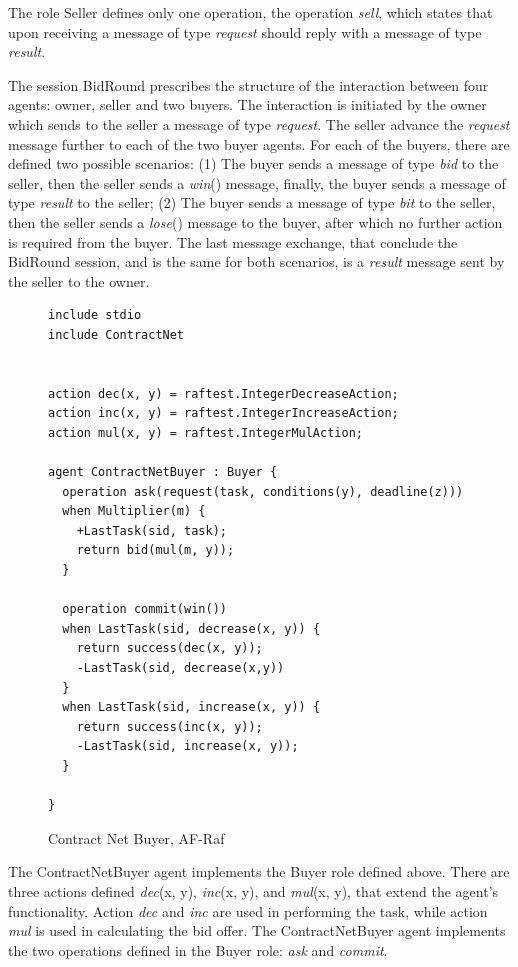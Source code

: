 \documentclass[a4paper,12pt,oneside,fleqn]{book} %
\begin{document}
The role Seller defines only one operation, the operation \textit{sell},
which states that upon receiving a message of type \textit{request} should reply
with a message of type \textit{result}.

The session BidRound prescribes the structure of the interaction between
four agents: owner, seller and two buyers. The interaction is initiated by
the owner which sends to the seller a message of type \textit{request}. The
seller advance the \textit{request} message further to each of the two
buyer agents. For each of the buyers, there are defined two possible
scenarios: (1) The buyer sends a message of type \textit{bid} to the
seller, then the seller sends a \textit{win}() message, finally, the buyer
sends a message of type \textit{result} to the seller; (2) The buyer sends
a message of type \textit{bit} to the seller, then the seller sends a
\textit{lose}() message to the buyer, after which no further action is
required from the buyer. The last message exchange, that conclude the
BidRound session, and is the same for both scenarios, is a \textit{result}
message sent by the seller to the owner.

\begin{figure}\footnotesize %
\begin{verbatim}
include stdio
include ContractNet


action dec(x, y) = raftest.IntegerDecreaseAction;
action inc(x, y) = raftest.IntegerIncreaseAction;
action mul(x, y) = raftest.IntegerMulAction;

agent ContractNetBuyer : Buyer {
  operation ask(request(task, conditions(y), deadline(z)))
  when Multiplier(m) {
    +LastTask(sid, task);
    return bid(mul(m, y));
  }

  operation commit(win())
  when LastTask(sid, decrease(x, y)) {
    return success(dec(x, y));
    -LastTask(sid, decrease(x,y))
  }
  when LastTask(sid, increase(x, y)) {
    return success(inc(x, y));
    -LastTask(sid, increase(x, y));
  }

}
\end{verbatim}
\caption{Contract Net Buyer, AF-Raf}
\label{fig:contract-buyer}
\end{figure} %

The ContractNetBuyer agent implements the Buyer role defined above. There
are three actions defined \textit{dec}(x, y), \textit{inc}(x, y), and
\textit{mul}(x, y), that extend the agent's functionality. Action
\textit{dec} and \textit{inc} are used in performing the task,
while action \textit{mul} is used in calculating the bid offer. The
ContractNetBuyer agent implements the two operations defined in the Buyer
role: \textit{ask} and \textit{commit}.
\end{document}
